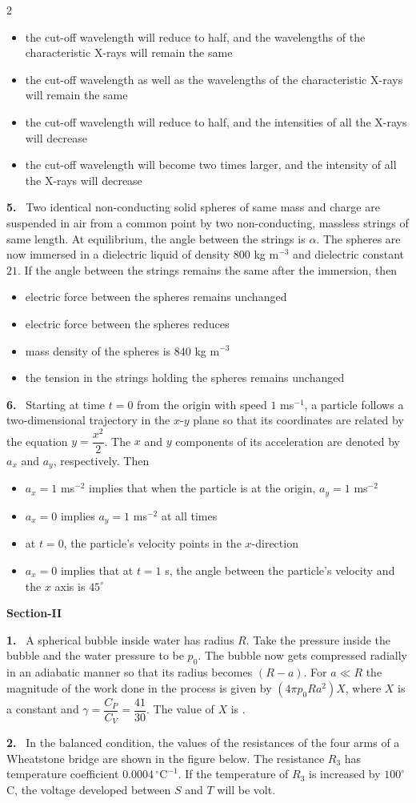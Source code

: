 \documentclass[10pt]{extarticle}
\newcommand{\sect}[1]{\par\smallskip\noindent\textbf{#1}\par}
\newcommand{\qn}[1]{\par\smallskip\noindent\textbf{#1.}~}
\newenvironment{qoptions}{\begin{itemize}[leftmargin=1.8em,itemsep=1pt,topsep=2pt,label={}]}{\end{itemize}}
\newcommand{\opt}[2]{\item[(#1)] #2}
\begin{document}
\begin{multicols}{2}
\begin{qoptions}
\opt{A}{the cut-off wavelength will reduce to half, and the wavelengths of the characteristic X-rays will remain the same}
\opt{B}{the cut-off wavelength as well as the wavelengths of the characteristic X-rays will remain the same}
\opt{C}{the cut-off wavelength will reduce to half, and the intensities of all the X-rays will decrease}
\opt{D}{the cut-off wavelength will become two times larger, and the intensity of all the X-rays will decrease}
\end{qoptions}
\qn{5} Two identical non-conducting solid spheres of same mass and charge are suspended in air from a common point by two non-conducting, massless strings of same length. At equilibrium, the angle between the strings is $\alpha$. The spheres are now immersed in a dielectric liquid of density $800$ kg m$^{-3}$ and dielectric constant $21$. If the angle between the strings remains the same after the immersion, then
\begin{qoptions}
\opt{A}{electric force between the spheres remains unchanged}
\opt{B}{electric force between the spheres reduces}
\opt{C}{mass density of the spheres is $840$ kg m$^{-3}$}
\opt{D}{the tension in the strings holding the spheres remains unchanged}
\end{qoptions}
\qn{6} Starting at time $t=0$ from the origin with speed $1$ ms$^{-1}$, a particle follows a two-dimensional trajectory in the $x$-$y$ plane so that its coordinates are related by the equation $y=\dfrac{x^2}{2}$. The $x$ and $y$ components of its acceleration are denoted by $a_x$ and $a_y$, respectively. Then
\begin{qoptions}
\opt{A}{$a_x=1$ ms$^{-2}$ implies that when the particle is at the origin, $a_y=1$ ms$^{-2}$}
\opt{B}{$a_x=0$ implies $a_y=1$ ms$^{-2}$ at all times}
\opt{C}{at $t=0$, the particle's velocity points in the $x$-direction}
\opt{D}{$a_x=0$ implies that at $t=1$ s, the angle between the particle's velocity and the $x$ axis is $45^\circ$}
\end{qoptions}
\sect{Section-II}
\qn{1} A spherical bubble inside water has radius $R$. Take the pressure inside the bubble and the water pressure to be $p_0$. The bubble now gets compressed radially in an adiabatic manner so that its radius becomes $(R-a)$. For $a\ll R$ the magnitude of the work done in the process is given by $(4\pi p_0Ra^2)X$, where $X$ is a constant and $\gamma=\dfrac{C_P}{C_V}=\dfrac{41}{30}$. The value of $X$ is \underline{\hspace{2cm}}.
\qn{2} In the balanced condition, the values of the resistances of the four arms of a Wheatstone bridge are shown in the figure below. The resistance $R_3$ has temperature coefficient $0.0004\,^\circ\mathrm{C}^{-1}$. If the temperature of $R_3$ is increased by $100^\circ$C, the voltage developed between $S$ and $T$ will be \underline{\hspace{2cm}} volt.

\end{multicols}
\end{document}
